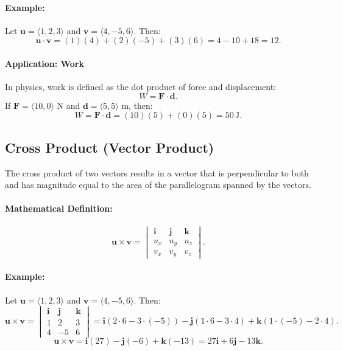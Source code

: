 \documentclass[12pt]{article}
\begin{document}
\paragraph{Example:}
Let $\mathbf{u} = \langle 1, 2, 3 \rangle$ and $\mathbf{v} = \langle 4, -5, 6 \rangle$. Then:
\[
\mathbf{u} \cdot \mathbf{v} = (1)(4) + (2)(-5) + (3)(6) = 4 - 10 + 18 = 12.
\]

\paragraph{Application: Work}
In physics, work is defined as the dot product of force and displacement:
\[
W = \mathbf{F} \cdot \mathbf{d}.
\]
If $\mathbf{F} = \langle 10, 0 \rangle$ N and $\mathbf{d} = \langle 5, 5 \rangle$ m, then:
\[
W = \mathbf{F} \cdot \mathbf{d} = (10)(5) + (0)(5) = 50\, \text{J}.
\]

\subsection{Cross Product (Vector Product)}
The cross product of two vectors results in a vector that is perpendicular to both and has magnitude equal to the area of the parallelogram spanned by the vectors.

\paragraph{Mathematical Definition:}
\[
\mathbf{u} \times \mathbf{v} = \begin{vmatrix}
\mathbf{i} & \mathbf{j} & \mathbf{k} \\
 u_x & u_y & u_z \\
 v_x & v_y & v_z
\end{vmatrix}.
\]

\paragraph{Example:}
Let $\mathbf{u} = \langle 1, 2, 3 \rangle$ and $\mathbf{v} = \langle 4, -5, 6 \rangle$. Then:
\[
\mathbf{u} \times \mathbf{v} = \begin{vmatrix}
\mathbf{i} & \mathbf{j} & \mathbf{k} \\
 1 & 2 & 3 \\
 4 & -5 & 6
\end{vmatrix} = \mathbf{i}(2\cdot6 - 3\cdot(-5)) - \mathbf{j}(1\cdot6 - 3\cdot4) + \mathbf{k}(1\cdot(-5) - 2\cdot4).
\]
\[
\mathbf{u} \times \mathbf{v} = \mathbf{i}(27) - \mathbf{j}(-6) + \mathbf{k}(-13) = 27\mathbf{i} + 6\mathbf{j} - 13\mathbf{k}.
\]
\end{document}

